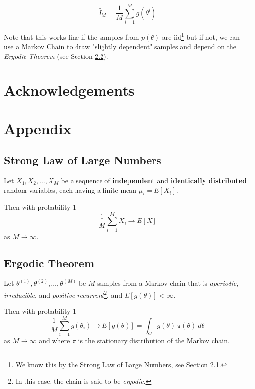 \documentclass[11pt, oneside]{article}   	%
\begin{document}
\begin{equation}
\hat{I}_{M} = \frac{1}{M} \sum\limits_{i = 1}^{M} g(\theta^{i})
\end{equation}

\noindent
Note that this works fine if the samples from $p(\theta)$ are iid\footnote{We know this by the Strong Law of Large Numbers, see Section \ref{sec:slln}.} but if not, we can use a Markov Chain to draw "slightly dependent" samples and depend on the \emph{Ergodic Theorem} (see Section \ref{sec:ergodic}).


\section{Acknowledgements}

\newpage




\section{Appendix}
\subsection{Strong Law of Large Numbers}
\label{sec:slln}

Let $X_{1}, X_{2}, \hdots, X_{M}$ be a sequence of \textbf{independent} and \textbf{identically distributed} random variables, each having a finite mean $\mu_i = E[X_{i}]$. 

\bigskip
\noindent
Then with probability 1
\begin{equation}
\frac{1}{M}\sum\limits_{i=1}^{M} X_i \rightarrow E[X]
\end{equation}
as  $M \rightarrow \infty$.

\subsection{Ergodic Theorem}
\label{sec:ergodic}
Let $\theta^{(1)}, \theta^{(2)}, \hdots, \theta^{(M)}$ be $M$ samples from a Markov chain that is \emph{aperiodic}, \emph{irreducible}, and \emph{positive recurrent}\footnote{In this case, the chain is said to be \emph{ergodic}.}, and $E[g(\theta)] < \infty$.

\bigskip
\noindent
Then with probability 1
\begin{equation}
\frac{1}{M}\sum\limits_{i = 1}^{M} g(\theta_{i}) \rightarrow E[g(\theta)]  = \int_{\Theta}^{}g(\theta) \: \pi(\theta) \:d\theta
\end{equation}
as $M \rightarrow \infty$ and where $\pi$ is the stationary distribution of the Markov chain.
\end{document}

